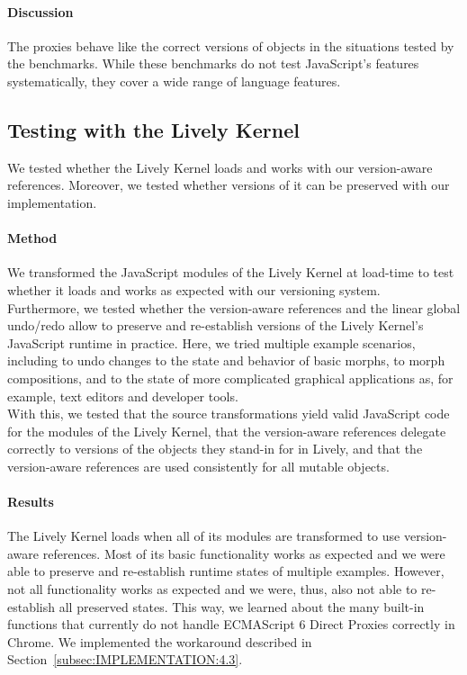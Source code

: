 \paragraph{Discussion}
The proxies behave like the correct versions of objects in the situations tested by the benchmarks.
While these benchmarks do not test JavaScript's features systematically, they cover a wide range of language features.


\subsection{Testing with the Lively Kernel}

We tested whether the Lively Kernel loads and works with our version-aware references.
Moreover, we tested whether versions of it can be preserved with our implementation.

\paragraph{Method}
We transformed the JavaScript modules of the Lively Kernel at load-time to test whether it loads and works as expected with our versioning system.\\
Furthermore, we tested whether the version-aware references and the linear global undo/redo allow to preserve and re-establish versions of the Lively Kernel's JavaScript runtime in practice.
Here, we tried multiple example scenarios, including to undo changes to the state and behavior of basic morphs, to morph compositions, and to the state of more complicated graphical applications as, for example, text editors and developer tools.\\
With this, we tested that the source transformations yield valid JavaScript code for the modules of the Lively Kernel, that the version-aware references delegate correctly to versions of the objects they stand-in for in Lively, and that the version-aware references are used consistently for all mutable objects.


\paragraph{Results}
The Lively Kernel loads when all of its modules are transformed to use version-aware references.
Most of its basic functionality works as expected and we were able to preserve and re-establish runtime states of multiple examples.
However, not all functionality works as expected and we were, thus, also not able to re-establish all preserved states.
This way, we learned about the many built-in functions that currently do not handle ECMAScript 6 Direct Proxies correctly in Chrome.
We implemented the workaround described in Section~\ref{subsec:IMPLEMENTATION:4.3}.

